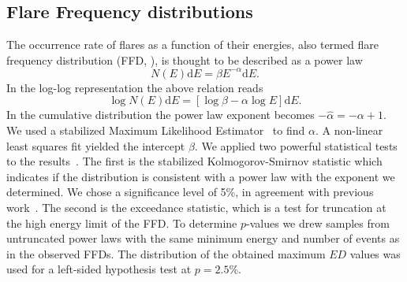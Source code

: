 \documentclass[twocolumn]{aastex62}
\begin{document}
\subsection{Flare Frequency distributions} \label{subsec:FFD}
The occurrence rate of flares as a function of their energies, also termed flare frequency distribution (FFD, \cite{lacy1976}), is thought to be described as a power law
\begin{equation}
N(E)\mathrm{d}E = \beta E^{-\alpha}\mathrm{d}E.
\end{equation}
In the log-log representation the above relation reads
\begin{equation}
\log N(E) \mathrm{d}E = [\log\beta -\alpha\log E] \mathrm{d}E.
\end{equation}
In the cumulative distribution the power law exponent becomes $-\hat{\alpha} = -\alpha +1$. 
We used a stabilized Maximum Likelihood Estimator~\citep{maschberger2009} to find $\alpha$. A non-linear least squares fit yielded the intercept $\beta$. We applied two powerful statistical tests to the results~\citep{maschberger2009}. The first is the stabilized Kolmogorov-Smirnov statistic which indicates if the distribution is consistent with a power law with the exponent we determined. We chose a significance level of 5\%, in agreement with previous work~\citep{loyd2018}. The second is the exceedance statistic, which is a test for truncation at the high energy limit of the FFD. To determine $p$-values we drew samples from untruncated power laws with the same minimum energy and number of events as in the observed FFDs. The distribution of the obtained maximum $ED$ values was used for a left-sided hypothesis test at $p=2.5\%$. 
\\
\end{document}
